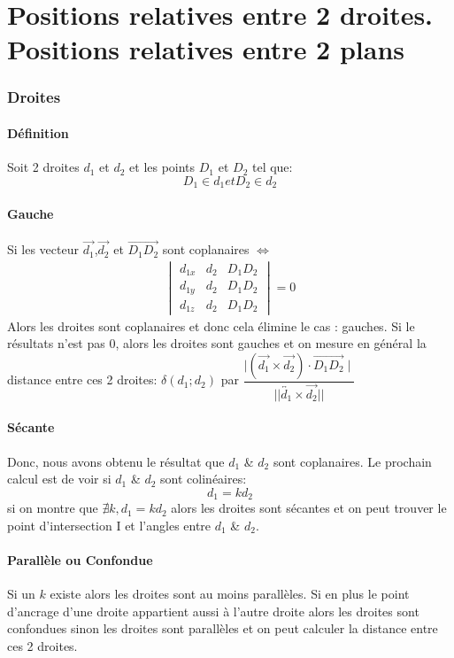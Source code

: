 \documentclass[12pt,a4paper]{report}
\begin{document}
	\chapter[Géométrie dans l'espace]{Positions relatives entre 2 droites. Positions relatives entre 2 plans}
	\subsection*{Droites}
	\pagebreak
	\subsubsection*{Définition}
	Soit 2 droites $d_1$ et $d_2$ et les points $D_1$ et $D_2$ tel que: \[D_1 \in d_1 et D_2 \in d_2\] 
	\subsubsection*{Gauche}
	Si les vecteur $\overrightarrow{d_1}$,$\overrightarrow{d_2}$ et $\overrightarrow{D_1D_2}$ sont coplanaires $\Leftrightarrow$ 
	\begin{gather}
	\begin{vmatrix} 
	d_{1x} & d_2 & D_1D_2 \\ 
	d_{1y} & d_2 & D_1D_2 \\
	d_{1z} & d_2 & D_1D_2 
	\end{vmatrix}
	=0
	\end{gather}	
	Alors les droites sont coplanaires et donc cela élimine le cas : gauches.
	Si le résultats n'est pas 0, alors les droites sont gauches et on mesure en général la distance entre ces 2 droites: $ \delta(d_1;d_2) $ par $\dfrac{\mid (\overrightarrow{d_1} \times \overrightarrow{d_2})\cdot \overrightarrow{D_1D_2} \mid}{||\overleftrightarrow{d_1} \times \overrightarrow{d_2}||}$
	\subsubsection*{Sécante}
	Donc, nous avons obtenu le résultat que $d_1$ \& $d_2$ sont coplanaires. Le prochain calcul est de voir si $d_1$ \&  $d_2$ sont colinéaires: \[ d_1=kd_2 \] 
	si on montre que $\nexists k, d_1=kd_2$ alors les droites sont sécantes et on peut trouver le point d'intersection I et l'angles entre $d_1$ \& $d_2$.
	\subsubsection*{Parallèle ou Confondue}
	
	Si un $k$ existe alors les droites sont au moins parallèles. Si en plus le point d'ancrage d'une droite appartient aussi à l'autre droite alors les droites sont confondues sinon les droites sont parallèles et on peut calculer la distance entre ces 2 droites.
	
\end{document}
